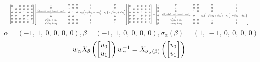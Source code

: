 \documentclass[11pt]{article}
\theoremstyle{definition}
\begin{document}
\[
\scaletoalign{\textwidth}{{\left[\begin{matrix}0 & 1 & 0 & 0 & 0 & 0\\1 & 0 & 0 & 0 & 0 & 0\\0 & 0 & 0 & 1 & 0 & 0\\0 & 0 & 1 & 0 & 0 & 0\\0 & 0 & 0 & 0 & 1 & 0\\0 & 0 & 0 & 0 & 0 & 1\end{matrix}\right]} {\left[\begin{matrix}1 & 0 & 0 & 0 & 0 & 0\\0 & 1 & 0 & 0 & 0 & 0\\\frac{\sqrt{d} \left(c_{0} d u_{0}^{2} - c_{0} u_{2}^{2} + c_{1} d u_{3}^{2} - c_{1} u_{1}^{2}\right)}{2} & 0 & 1 & 0 & c_{0} \left(- \sqrt{d} u_{2} + d u_{0}\right) & c_{1} \left(- \sqrt{d} u_{1} + d u_{3}\right)\\0 & 0 & 0 & 1 & 0 & 0\\\sqrt{d} u_{0} + u_{2} & 0 & 0 & 0 & 1 & 0\\\sqrt{d} u_{3} + u_{1} & 0 & 0 & 0 & 0 & 1\end{matrix}\right]} {\left[\begin{matrix}0 & 1 & 0 & 0 & 0 & 0\\1 & 0 & 0 & 0 & 0 & 0\\0 & 0 & 0 & 1 & 0 & 0\\0 & 0 & 1 & 0 & 0 & 0\\0 & 0 & 0 & 0 & 1 & 0\\0 & 0 & 0 & 0 & 0 & 1\end{matrix}\right]} = {\left[\begin{matrix}1 & 0 & 0 & 0 & 0 & 0\\0 & 1 & 0 & 0 & 0 & 0\\0 & 0 & 1 & 0 & 0 & 0\\0 & \frac{\sqrt{d} \left(c_{0} d u_{0}^{2} - c_{0} u_{2}^{2} + c_{1} d u_{3}^{2} - c_{1} u_{1}^{2}\right)}{2} & 0 & 1 & c_{0} \left(- \sqrt{d} u_{2} + d u_{0}\right) & c_{1} \left(- \sqrt{d} u_{1} + d u_{3}\right)\\0 & \sqrt{d} u_{0} + u_{2} & 0 & 0 & 1 & 0\\0 & \sqrt{d} u_{3} + u_{1} & 0 & 0 & 0 & 1\end{matrix}\right]}}
\]
\[
\alpha = \left( -1, \  1, \  0, \  0, \  0, \  0\right), \beta = \left( -1, \  1, \  0, \  0, \  0, \  0\right), \sigma_{\alpha}(\beta) = \left( 1, \  -1, \  0, \  0, \  0, \  0\right)
\]
\[
\scaletoalign{\textwidth}{w_{\alpha} X_{\beta}\left(\left[\begin{matrix}u_{0}\\u_{1}\end{matrix}\right]\right) w_{\alpha}^{-1} = X_{\sigma_{\alpha}\left(\beta\right)}\left(\left[\begin{matrix}u_{0}\\u_{1}\end{matrix}\right]\right)}
\]
\end{document}

